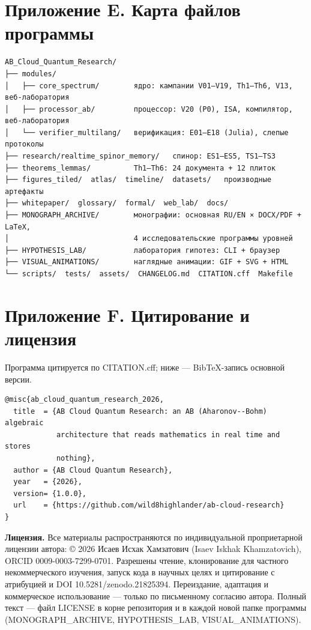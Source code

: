 \documentclass[11pt,a4paper]{article}
\begin{document}
\section{Приложение E. Карта файлов программы}

\begin{verbatim}
AB_Cloud_Quantum_Research/
├── modules/
│   ├── core_spectrum/        ядро: кампании V01–V19, Th1–Th6, V13, веб-лаборатория
│   ├── processor_ab/         процессор: V20 (P0), ISA, компилятор, веб-лаборатория
│   └── verifier_multilang/   верификация: E01–E18 (Julia), слепые протоколы
├── research/realtime_spinor_memory/   спинор: ES1–ES5, TS1–TS3
├── theorems_lemmas/          Th1–Th6: 24 документа + 12 плиток
├── figures_tiled/  atlas/  timeline/  datasets/   производные артефакты
├── whitepaper/  glossary/  formal/  web_lab/  docs/
├── MONOGRAPH_ARCHIVE/        монографии: основная RU/EN × DOCX/PDF + LaTeX,
│                             4 исследовательские программы уровней
├── HYPOTHESIS_LAB/           лаборатория гипотез: CLI + браузер
├── VISUAL_ANIMATIONS/        наглядные анимации: GIF + SVG + HTML
└── scripts/  tests/  assets/  CHANGELOG.md  CITATION.cff  Makefile
\end{verbatim}

\section{Приложение F. Цитирование и лицензия}

Программа цитируется по CITATION.cff; ниже — BibTeX-запись основной версии.

\begin{verbatim}
@misc{ab_cloud_quantum_research_2026,
  title  = {AB Cloud Quantum Research: an AB (Aharonov--Bohm) algebraic
            architecture that reads mathematics in real time and stores
            nothing},
  author = {AB Cloud Quantum Research},
  year   = {2026},
  version= {1.0.0},
  url    = {https://github.com/wild8highlander/ab-cloud-research}
}
\end{verbatim}

\textbf{Лицензия.} Все материалы распространяются по индивидуальной проприетарной лицензии автора: © 2026 Исаев Исхак Хамзатович (Isaev Iskhak Khamzatovich), ORCID 0009-0003-7299-0701. Разрешены чтение, клонирование для частного некоммерческого изучения, запуск кода в научных целях и цитирование с атрибуцией и DOI 10.5281/zenodo.21825394. Переиздание, адаптация и коммерческое использование — только по письменному согласию автора. Полный текст — файл LICENSE в корне репозитория и в каждой новой папке программы (MONOGRAPH\_ARCHIVE, HYPOTHESIS\_LAB, VISUAL\_ANIMATIONS).
\end{document}
